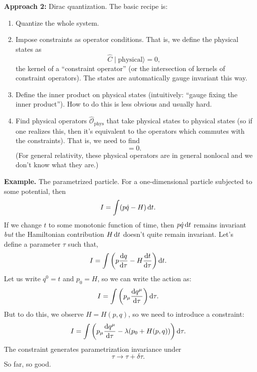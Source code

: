 \bigbreak
\textbf{Approach 2:} Dirac quantization. The basic recipe is:
\begin{enumerate}
\item Quantize the whole system.
\item Impose constraints as operator conditions. That is, we define the
  physical states as
  \begin{equation}
\widehat{C}\mid\mbox{physical}\rangle = 0,
  \end{equation}
  the kernel of a ``constraint operator'' (or the intersection of
  kernels of constraint operators). The states are automatically gauge
  invariant this way.
\item Define the inner product on physical states (intuitively: ``gauge
  fixing the inner product''). How to do this is less obvious and usually hard.
\item Find physical operators $\widehat{\mathcal{O}}_{\text{phys}}$ that take physical states to physical
  states (so if one realizes this, then it's equivalent to the operators
  which commutes with the constraints). That is, we need to find
  \begin{equation}
[\widehat{\mathcal{O}}_{\text{phys}},\widehat{C}]=0.
  \end{equation}
(For general relativity, these physical operators are in general
  nonlocal and we don't know what they are.)
\end{enumerate}

\bigbreak\noindent\textbf{Example.}
The parametrized particle. For a one-dimensional particle subjected to
some potential, then
\begin{equation}
I = \int(p\dot{q} - H)\,\mathrm{d} t.
\end{equation}
If we change $t$ to some monotonic function of time, then $p\dot{q}\,\mathrm{d} t$
remains invariant \emph{but} the Hamiltonian contribution $H\,\mathrm{d} t$
doesn't quite remain invariant. Let's define a parameter $\tau$ such
that,
\begin{equation}
I = \int\left(p\frac{\mathrm{d} q}{\mathrm{d} \tau} - H\frac{\mathrm{d} t}{\mathrm{d}\tau}\right)\mathrm{d} t.
\end{equation}
Let us write $q^{0}=t$ and $p_{0}=H$, so we can write the action as:
\begin{equation}
I = \int\left(p_{\mu}\frac{\mathrm{d} q^{\mu}}{\mathrm{d}\tau}\right)\mathrm{d}\tau.
\end{equation}
But to do this, we observe $H=H(p,q)$, so we need to introduce a
constraint:
\begin{equation}
I = \int\left(p_{\mu}\frac{\mathrm{d} q^{\mu}}{\mathrm{d}\tau} - \lambda(p_{0}+H(p,q))\right)\mathrm{d}\tau.
\end{equation}
The constraint generates parametrization invariance under
\begin{equation}
\tau\to\tau+\delta\tau.
\end{equation}
So far, so good.


